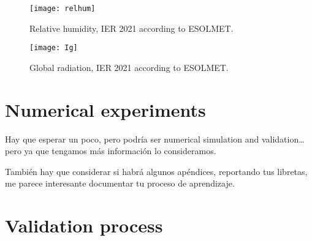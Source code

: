 \begin{figure}
 \centering
 \texttt{[image: relhum]}
 \caption{	
 Relative humidity, IER 2021 according to ESOLMET.
 \label{fig:rh}
 }
\end{figure}


\begin{figure}
 \centering
 \texttt{[image: Ig]}
 \caption{	
 Global radiation, IER 2021 according to ESOLMET.
 \label{fig:rh}
 }
\end{figure}



 
 
 \section{Numerical experiments}
 
 Hay que esperar un poco, pero podría ser numerical simulation and validation… pero ya que tengamos más información lo consideramos.


También hay que considerar si habrá algunos apéndices, reportando tus libretas, me parece interesante documentar tu proceso de aprendizaje.
 
 \section{Validation process}
 
